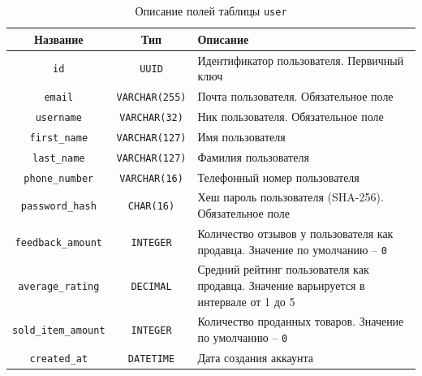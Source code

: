 \documentclass[a4paper,14pt]{extarticle}
\begin{document}
\begin{center}
    \begin{longtable}{|c|c|>{\centering\arraybackslash}m{8cm}|}
        \caption{Описание полей таблицы \texttt{user}}
        \label{tab:user}
        \\
        \hline
        \textbf{Название}           & \textbf{Тип}          & \textbf{Описание}                                                                     \\
        \hline
        \texttt{id}                 & \texttt{UUID}         & Идентификатор пользователя. Первичный ключ                                            \\
        \hline
        \texttt{email}              & \texttt{VARCHAR(255)} & Почта пользователя. Обязательное поле                                                 \\
        \hline
        \texttt{username}           & \texttt{VARCHAR(32)}  & Ник пользователя. Обязательное поле                                                   \\
        \hline
        \texttt{first\_name}        & \texttt{VARCHAR(127)} & Имя пользователя                                                                      \\
        \hline
        \texttt{last\_name}         & \texttt{VARCHAR(127)} & Фамилия пользователя                                                                  \\
        \hline
        \texttt{phone\_number}      & \texttt{VARCHAR(16)}  & Телефонный номер пользователя                                                         \\
        \hline
        \texttt{password\_hash}     & \texttt{CHAR(16)}     & Хеш пароль пользователя (SHA-256). Обязательное поле                                  \\
        \hline
        \texttt{feedback\_amount}   & \texttt{INTEGER}      & Количество отзывов у пользователя как продавца. Значение по умолчанию -- \texttt{0}   \\
        \hline
        \texttt{average\_rating}    & \texttt{DECIMAL}      & Средний рейтинг пользователя как продавца. Значение варьируется в интервале от 1 до 5 \\
        \hline
        \texttt{sold\_item\_amount} & \texttt{INTEGER}      & Количество проданных товаров. Значение по умолчанию -- \texttt{0}                     \\
        \hline
        \texttt{created\_at}        & \texttt{DATETIME}     & Дата создания аккаунта                                                                \\
        \hline
    \end{longtable}
\end{center}
\end{document}
